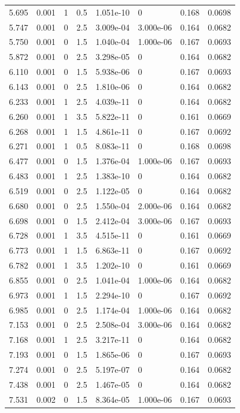 \documentclass[preview]{standalone}
\begin{document}
{{{\begin{tabular}{L{1.2cm}C{1.2cm} C{0.3cm}C{0.5cm} C{1.4cm}C{1.4cm} C{1.4cm}C{1.4cm}}
  5.695  &  0.001  & 1     & 0.5 &  1.051e-10  & 0  & 0.168 &  0.0698   \\ 
  5.747  &  0.001  & 0     & 2.5 &  3.009e-04  & 3.000e-06  & 0.164 &  0.0682   \\ 
  5.750  &  0.001  & 0     & 1.5 &  1.040e-04  & 1.000e-06  & 0.167 &  0.0693   \\ 
  5.872  &  0.001  & 0     & 2.5 &  3.298e-05  & 0  & 0.164 &  0.0682   \\ 
  6.110  &  0.001  & 0     & 1.5 &  5.938e-06  & 0  & 0.167 &  0.0693   \\ 
  6.143  &  0.001  & 0     & 2.5 &  1.810e-06  & 0  & 0.164 &  0.0682   \\ 
  6.233  &  0.001  & 1     & 2.5 &  4.039e-11  & 0  & 0.164 &  0.0682   \\ 
  6.260  &  0.001  & 1     & 3.5 &  5.822e-11  & 0  & 0.161 &  0.0669   \\ 
  6.268  &  0.001  & 1     & 1.5 &  4.861e-11  & 0  & 0.167 &  0.0692   \\ 
  6.271  &  0.001  & 1     & 0.5 &  8.083e-11  & 0  & 0.168 &  0.0698   \\ 
  6.477  &  0.001  & 0     & 1.5 &  1.376e-04  & 1.000e-06  & 0.167 &  0.0693   \\ 
  6.483  &  0.001  & 1     & 2.5 &  1.383e-10  & 0  & 0.164 &  0.0682   \\ 
  6.519  &  0.001  & 0     & 2.5 &  1.122e-05  & 0  & 0.164 &  0.0682   \\ 
  6.680  &  0.001  & 0     & 2.5 &  1.550e-04  & 2.000e-06  & 0.164 &  0.0682   \\ 
  6.698  &  0.001  & 0     & 1.5 &  2.412e-04  & 3.000e-06  & 0.167 &  0.0693   \\ 
  6.728  &  0.001  & 1     & 3.5 &  4.515e-11  & 0  & 0.161 &  0.0669   \\ 
  6.773  &  0.001  & 1     & 1.5 &  6.863e-11  & 0  & 0.167 &  0.0692   \\ 
  6.782  &  0.001  & 1     & 3.5 &  1.202e-10  & 0  & 0.161 &  0.0669   \\ 
  6.855  &  0.001  & 0     & 2.5 &  1.041e-04  & 1.000e-06  & 0.164 &  0.0682   \\ 
  6.973  &  0.001  & 1     & 1.5 &  2.294e-10  & 0  & 0.167 &  0.0692   \\ 
  6.985  &  0.001  & 0     & 2.5 &  1.174e-04  & 1.000e-06  & 0.164 &  0.0682   \\ 
  7.153  &  0.001  & 0     & 2.5 &  2.508e-04  & 3.000e-06  & 0.164 &  0.0682   \\ 
  7.168  &  0.001  & 1     & 2.5 &  3.217e-11  & 0  & 0.164 &  0.0682   \\ 
  7.193  &  0.001  & 0     & 1.5 &  1.865e-06  & 0  & 0.167 &  0.0693   \\ 
  7.274  &  0.001  & 0     & 2.5 &  5.197e-07  & 0  & 0.164 &  0.0682   \\ 
  7.438  &  0.001  & 0     & 2.5 &  1.467e-05  & 0  & 0.164 &  0.0682   \\ 
  7.531  &  0.002  & 0     & 1.5 &  8.364e-05  & 1.000e-06  & 0.167 &  0.0693   \\ 
\hline 
\end{tabular} 

}}}
\end{document}
